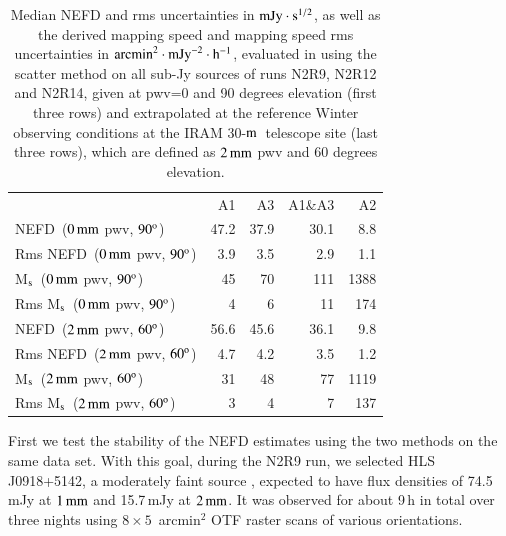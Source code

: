 \documentclass[traditionalabstract]{aa}
\newcommand{\hls}{HLS\,J0918+5142}
\newcommand{\trentemetre}{30-$\rm{m}$}
\begin{document}
\begin{table}[!thbp]
  \begin{center}
    \caption[NEFD estimates on all sub-Jy sources]{Median NEFD and rms
      uncertainties in $\rm{mJy}\cdot s^{1/2}$, as well as the derived mapping
      speed and mapping speed rms uncertainties in
    $\rm{arcmin}^2\cdot \rm{mJy}^{-2}\cdot\rm{h}^{-1}$, evaluated
      in using the scatter method on all sub-Jy sources of runs N2R9, N2R12
      and N2R14, given at pwv=0 and 90 degrees elevation (first three rows) and extrapolated at the
      reference Winter observing conditions at the IRAM
      \trentemetre\ telescope site (last three rows), which are defined
      as $2\,\rm{mm}$ pwv and 60 degrees elevation.}
    \label{tab:nefd_astro}
    \begin{tabular}{lrrrr}
      \hline\hline
      \noalign{\smallskip}
                    & A1      &   A3    &   A1\&A3 &    A2 \\
      \noalign{\smallskip}
      \hline
      \noalign{\smallskip}
      NEFD\, \small{($0\,\rm{mm}$ pwv, $90^{\rm{o}}$)}             & 47.2    & 37.9    &    30.1  &    8.8   \\
      Rms NEFD\, \small{($0\,\rm{mm}$ pwv, $90^{\rm{o}}$)}         &  3.9    &  3.5    &     2.9  &    1.1   \\
      M$_{\rm{s}}$\, \small{($0\,\rm{mm}$ pwv, $90^{\rm{o}}$)}      & 45      &  70     &    111   &   1388   \\
      Rms M$_{\rm{s}}$\, \small{($0\,\rm{mm}$ pwv, $90^{\rm{o}}$)}  &  4      &   6     &     11   &    174   \\
      \hline
      \noalign{\smallskip}
      NEFD\, \small{($2\,\rm{mm}$ pwv, $60^{\rm{o}}$)}             & 56.6    & 45.6    &    36.1  &    9.8   \\
      Rms NEFD\, \small{($2\,\rm{mm}$ pwv, $60^{\rm{o}}$)}         &  4.7    & 4.2     &     3.5  &    1.2   \\
      M$_{\rm{s}}$\, \small{($2\,\rm{mm}$ pwv, $60^{\rm{o}}$)}      &  31    & 48       &    77   &   1119   \\
      Rms M$_{\rm{s}}$\, \small{($2\,\rm{mm}$ pwv, $60^{\rm{o}}$)}  &   3    &  4       &     7     &  137   \\
      \hline
    \end{tabular}
\end{center}
\end{table}

First we test the stability of the NEFD estimates using the two methods on the
same data set. With this goal, during the N2R9 run, we selected \hls, a
moderately faint source \citep{2012A&A...538L...4C}, expected to have
flux densities of 74.5\,mJy at $1\,\rm{mm}$
and 15.7\,mJy at $2\, \rm{mm}$. %
It was observed for about 9\,h in total over three nights using
$8 \times 5$~arcmin$^2$ OTF raster scans of various orientations.\\
\end{document}
